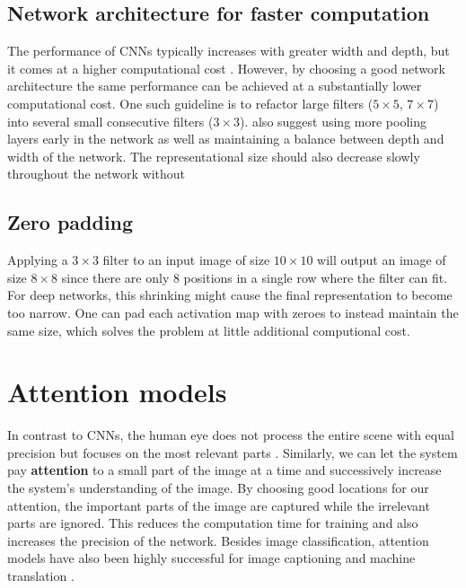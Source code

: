 \subsection{Network architecture for faster computation}

The performance of CNNs typically increases with greater width and depth, but it comes at a higher computational cost \cite{InceptionV3}. However, by choosing a good network architecture the same performance can be achieved at a substantially lower computational cost. One such guideline is to refactor large filters ($5 \times 5$, $7 \times 7$) into several small consecutive filters ($3 \times 3$). \textcite{InceptionV3} also suggest using more pooling layers early in the network as well as maintaining a balance between depth and width of the network. The representational size should also decrease slowly throughout the network without


\subsection{Zero padding}

Applying a $3 \times 3$ filter to an input image of size $10 \times 10$ will output an image of size $8 \times 8$ since there are only 8 positions in a single row where the filter can fit. For deep networks, this shrinking might cause the final representation to become too narrow.
One can pad each activation map with zeroes to instead maintain the same size, which solves the problem at little additional computional cost.

\newpage
\section{Attention models}
\label{ssec:attention}

In contrast to CNNs, the human eye does not process the entire scene with equal precision but focuses on the most relevant parts \cite{DeepMindAttention}.
Similarly, we can let the system pay \textbf{attention} to a small part of the image at a time and successively increase the system's understanding of the image.
By choosing good locations for our attention, the important parts of the image are captured while the irrelevant parts are ignored.
This reduces the computation time for training and also increases the precision of the network.
Besides image classification, attention models have also been highly successful for image captioning \cite{AttendAndTell} and machine translation \cite{machine_translation_attention}.

